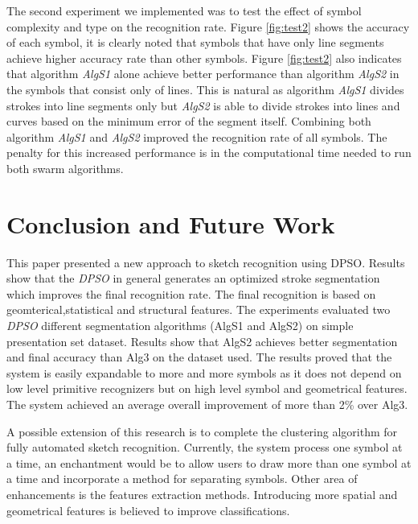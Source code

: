 \documentclass{article}
\begin{document}
The second experiment we implemented was to test the effect of symbol complexity and type on the recognition rate. Figure \ref{fig:test2} shows the accuracy of each symbol, it is clearly noted that symbols that have only line segments achieve higher accuracy rate than other symbols. Figure \ref{fig:test2} also indicates that algorithm \textsl{AlgS1} alone achieve better performance than algorithm  \textsl{AlgS2} in the symbols that consist only of lines. This is natural as algorithm \textsl{AlgS1} divides strokes into line segments only but \textsl{AlgS2} is able to divide strokes into lines and curves based on the minimum error of the segment itself. Combining both algorithm \textsl{AlgS1} and \textsl{AlgS2} improved the recognition rate of all symbols. The penalty for this increased performance is in the computational time needed to run both swarm algorithms. 
 
\section{Conclusion and Future Work}
\label{ConclusionandFutureWork}
This paper presented a new approach to sketch recognition using DPSO. Results show that the \textit{DPSO} in general generates an optimized stroke segmentation which improves the final recognition rate.  The final recognition is based on geomterical,statistical and structural features. The experiments evaluated two \textit{DPSO} different segmentation algorithms (AlgS1 and AlgS2) on simple presentation set dataset. Results show that AlgS2 achieves better segmentation and final accuracy than Alg3 \cite{earlyprocess} on the dataset used. The results proved that the system is easily expandable to more and more symbols as it does not depend on low level primitive recognizers but on high level symbol and geometrical features.  The system achieved an average overall improvement of more than 2\% over Alg3.  

 A possible extension of this research is to complete the clustering algorithm for fully automated sketch recognition. Currently, the system process one symbol at a time, an enchantment would be to allow users to draw more than one symbol at a time and incorporate a method for separating symbols. Other area of enhancements is the features extraction methods. Introducing more spatial and geometrical features is believed to improve classifications.  
 


\end{document}
